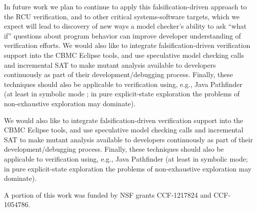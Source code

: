 \documentclass{svjour3}
\begin{document}
In future work we plan to continue to apply this falsification-driven
approach to the RCU verification, and to other critical
systems-software targets, which we expect will lead to discovery of
new ways a model checker's ability to ask ``what if'' questions about
program behavior \cite{GroceDist,MakeMost} can improve developer
understanding of verification efforts.   We would also like to
integrate falsification-driven verification support into the CBMC
Eclipse tools, and use speculative model checking calls and
incremental SAT to make mutant analysis available to developers
continuously as part of their development/debugging process.  Finally,
these techniques should also be applicable to verification using,
e.g., Java Pathfinder \cite{JPF2}  (at least in symbolic mode \cite{SymJPF}; in pure
explicit-state exploration the problems of non-exhaustive exploration
may dominate).

We would also like to
integrate falsification-driven verification support into the CBMC
Eclipse tools, and use speculative model checking calls and
incremental SAT to make mutant analysis available to developers
continuously as part of their development/debugging process.  Finally,
these techniques should also be applicable to verification using,
e.g., Java Pathfinder \cite{JPF2} (at least in symbolic mode; in pure
explicit-state exploration the problems of non-exhaustive exploration
may dominate).

{\scriptsize A portion of this work was funded by NSF grants CCF-1217824
and CCF-1054786.}



%







%
%
%
% 




\end{document}
